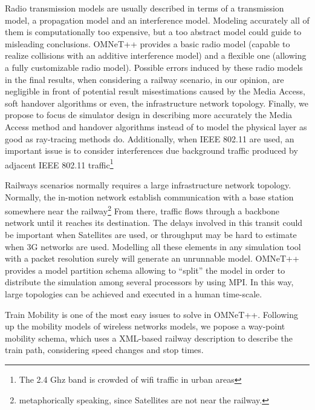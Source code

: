 \documentclass[times, 10pt,twocolumn]{article}
\begin{document}

Radio transmission models are usually described in terms of a transmission
model, a propagation model and an interference model. Modeling accurately all of
them is computationally too expensive, but a too abstract model could guide
to misleading conclusions. OMNeT++ provides a basic radio model (capable to
realize collisions with an additive interference model) and a flexible
one\cite{Kopke08} (allowing a fully customizable radio model). Possible errors
induced by these radio models in the final results, when considering a
railway scenario, in our opinion, are negligible in front of potential
result misestimations caused by the Media Access, soft handover
algorithms or even, the infrastructure network topology. Finally, we propose to
focus de simulator design in describing more accurately the Media Access method
and handover algorithms instead of to model the physical layer as good as
ray-tracing methods\cite{AgFo00} do. Additionally, when IEEE 802.11 are used, an
important issue is to consider interferences\cite{MDD09} due background traffic
produced by adjacent IEEE 802.11 traffic\footnote{The 2.4 Ghz band is crowded of wifi
traffic in urban areas}


Railways scenarios normally requires a large infrastructure network topology.
Normally, the in-motion network establish communication with a base station
somewhere near the railway\footnote{metaphorically speaking, since Satellites
are not near the railway.} From there, traffic flows through a backbone network
until it reaches its destination. The delays involved in this transit could be
important when Satellites are used, or throughput may be hard to estimate when
3G networks are used. Modelling all these elements in any simulation tool with
a packet resolution surely will generate an unrunnable model. OMNeT++ provides a
model partition schema allowing to ``split'' the model in order to distribute
the simulation among several processors by using MPI\cite{varga2003efficiency}. In
this way, large topologies can be achieved and executed in a human time-scale.


Train Mobility is one of the most easy issues to solve in OMNeT++. Following up
the mobility models of wireless networks models, we popose a way-point mobility
schema, which uses a XML-based railway description to describe the train
path, considering speed changes and stop times.  
 



\end{document}
